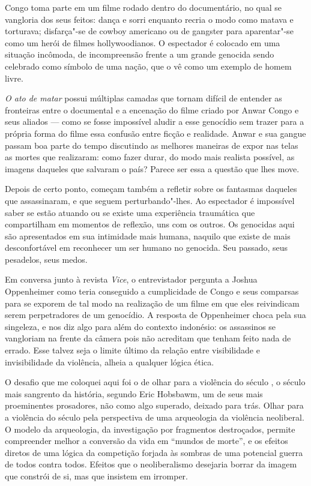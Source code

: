 Congo toma parte em um filme rodado dentro do documentário, no qual se
vangloria dos seus feitos: dança e sorri enquanto recria o modo como
matava e torturava; disfarça"-se de cowboy americano ou de gangster para
aparentar"-se como um herói de filmes hollywoodianos. O espectador é
colocado em uma situação incômoda, de incompreensão frente a um grande
genocida sendo celebrado como símbolo de uma nação, que o vê como um
exemplo de homem livre.

\emph{O ato de matar} possui múltiplas camadas que tornam difícil de
entender as fronteiras entre o documental e a encenação do filme criado
por Anwar Congo e seus aliados --- como se fosse impossível aludir a
esse genocídio sem trazer para a própria forma do filme essa confusão
entre ficção e realidade. Anwar e sua gangue passam boa parte do tempo
discutindo as melhores maneiras de expor nas telas as mortes que
realizaram: como fazer durar, do modo mais realista possível, as imagens
daqueles que salvaram o país? Parece ser essa a questão que lhes move.

Depois de certo ponto, começam também a refletir sobre os fantasmas
daqueles que assassinaram, e que seguem perturbando"-lhes. Ao espectador
é impossível saber se estão atuando ou se existe uma experiência
traumática que compartilham em momentos de reflexão, uns com os outros.
Os genocidas aqui são apresentados em sua intimidade mais humana,
naquilo que existe de mais desconfortável em reconhecer um ser humano no
genocida. Seu passado, seus pesadelos, seus medos.

\asterisc

Em conversa junto à revista \emph{Vice}, o entrevistador pergunta a Joshua
Oppenheimer como teria conseguido a cumplicidade de Congo e seus
comparsas para se exporem de tal modo na realização de um filme em que
eles reivindicam serem perpetradores de um genocídio. A resposta de
Oppenheimer choca pela sua singeleza, e nos diz algo para além do
contexto indonésio: os assassinos se vangloriam na frente da câmera
pois não acreditam que tenham feito nada de errado. Esse talvez seja o
limite último da relação entre visibilidade e invisibilidade da
violência, alheia a qualquer lógica ética.

\asterisc

O desafio que me coloquei aqui foi o de olhar para a violência do século , o século mais sangrento
da história, segundo Eric Hobsbawm, um de seus mais proeminentes
prosadores, não como algo superado, deixado para trás. Olhar para a
violência do século  pela perspectiva de uma arqueologia da violência
neoliberal. O modelo da arqueologia, da investigação por fragmentos
destroçados, permite compreender melhor a conversão da vida em ``mundos
de morte'', e os efeitos diretos de uma lógica da competição forjada às
sombras de uma potencial guerra de todos contra todos. Efeitos que o neoliberalismo
desejaria borrar da imagem que constrói de
si, mas que insistem em irromper.

